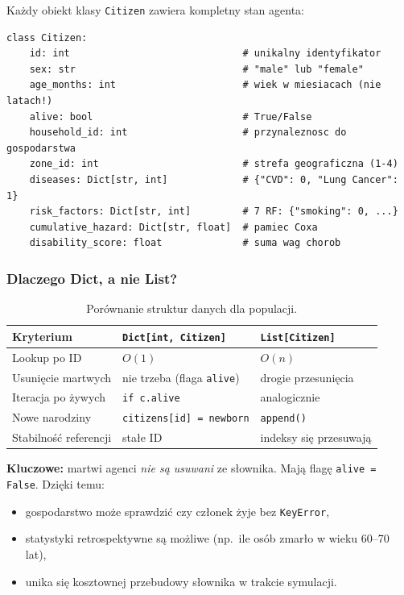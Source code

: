 \documentclass[11pt,a4paper]{article}
\begin{document}
Każdy obiekt klasy \texttt{Citizen} zawiera kompletny stan agenta:

\begin{lstlisting}
class Citizen:
    id: int                              # unikalny identyfikator
    sex: str                             # "male" lub "female"
    age_months: int                      # wiek w miesiacach (nie latach!)
    alive: bool                          # True/False
    household_id: int                    # przynaleznosc do gospodarstwa
    zone_id: int                         # strefa geograficzna (1-4)
    diseases: Dict[str, int]             # {"CVD": 0, "Lung Cancer": 1}
    risk_factors: Dict[str, int]         # 7 RF: {"smoking": 0, ...}
    cumulative_hazard: Dict[str, float]  # pamiec Coxa
    disability_score: float              # suma wag chorob
\end{lstlisting}

\subsubsection{Dlaczego Dict, a nie List?}

\begin{table}[h]
\centering
\small
\begin{tabular}{lll}
\toprule
\textbf{Kryterium} & \texttt{Dict[int, Citizen]} & \texttt{List[Citizen]} \\
\midrule
Lookup po ID                & $O(1)$               & $O(n)$ \\
Usunięcie martwych          & nie trzeba (flaga \texttt{alive}) & drogie przesunięcia \\
Iteracja po żywych          & \texttt{if c.alive}  & analogicznie \\
Nowe narodziny              & \texttt{citizens[id] = newborn} & \texttt{append()} \\
Stabilność referencji       & stałe ID & indeksy się przesuwają \\
\bottomrule
\end{tabular}
\caption{Porównanie struktur danych dla populacji.}
\end{table}

\textbf{Kluczowe:} martwi agenci \emph{nie są usuwani} ze słownika. Mają flagę \texttt{alive = False}. Dzięki temu:
\begin{itemize}
  \item gospodarstwo może sprawdzić czy członek żyje bez \texttt{KeyError},
  \item statystyki retrospektywne są możliwe (np.\ ile osób zmarło w wieku 60--70 lat),
  \item unika się kosztownej przebudowy słownika w trakcie symulacji.
\end{itemize}
\end{document}
